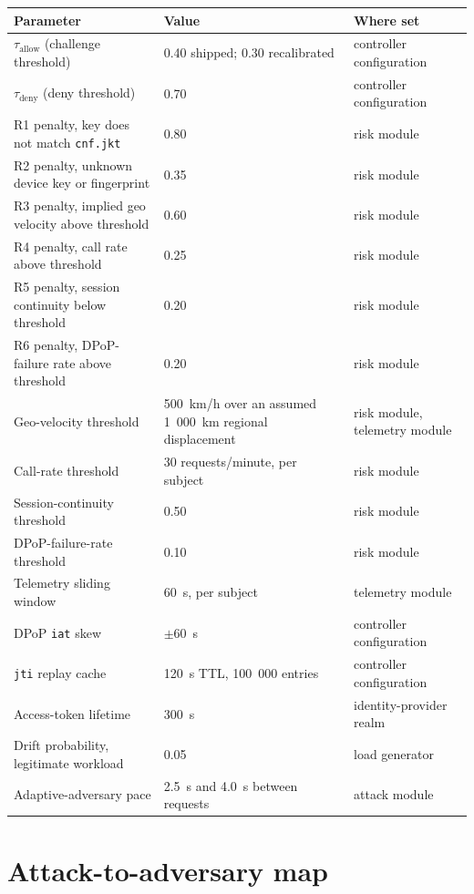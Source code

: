 \begin{table}[h]
\centering
\small
\begin{tabular}{p{4.3cm}p{2.0cm}p{1.3cm}}
\toprule
Parameter & Value & Where set \\
\midrule
$\tau_{\mathrm{allow}}$ (challenge threshold) & 0.40 shipped; 0.30 recalibrated & controller configuration \\
$\tau_{\mathrm{deny}}$ (deny threshold) & 0.70 & controller configuration \\
R1 penalty, key does not match \texttt{cnf.jkt} & 0.80 & risk module \\
R2 penalty, unknown device key or fingerprint & 0.35 & risk module \\
R3 penalty, implied geo velocity above threshold & 0.60 & risk module \\
R4 penalty, call rate above threshold & 0.25 & risk module \\
R5 penalty, session continuity below threshold & 0.20 & risk module \\
R6 penalty, DPoP-failure rate above threshold & 0.20 & risk module \\
Geo-velocity threshold & 500~km/h over an assumed 1~000~km regional displacement & risk module, telemetry module \\
Call-rate threshold & 30 requests/minute, per subject & risk module \\
Session-continuity threshold & 0.50 & risk module \\
DPoP-failure-rate threshold & 0.10 & risk module \\
Telemetry sliding window & 60~s, per subject & telemetry module \\
DPoP \texttt{iat} skew & $\pm$60~s & controller configuration \\
\texttt{jti} replay cache & 120~s TTL, 100~000 entries & controller configuration \\
Access-token lifetime & 300~s & identity-provider realm \\
Drift probability, legitimate workload & 0.05 & load generator \\
Adaptive-adversary pace & 2.5~s and 4.0~s between requests & attack module \\
\bottomrule
\end{tabular}
\end{table}

\section{Attack-to-adversary map}
\label{app:b}

